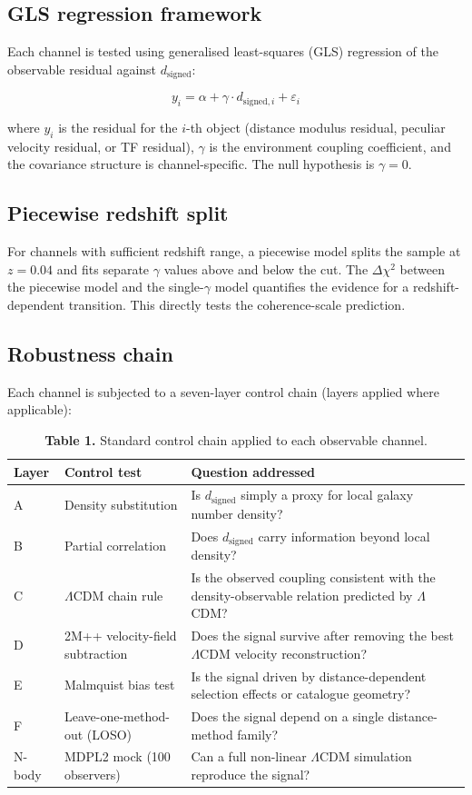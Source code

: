 \documentclass[11pt,a4paper]{article}
\begin{document}
\subsection{GLS regression framework}
Each channel is tested using generalised least-squares (GLS) regression of the observable residual against \(d_\mathrm{signed}\):

\[
y_i = \alpha + \gamma \cdot d_{\mathrm{signed},i} + \varepsilon_i
\]

where \(y_i\) is the residual for the \(i\)-th object (distance modulus residual, peculiar velocity residual, or TF residual), \(\gamma\) is the environment coupling coefficient, and the covariance structure is channel-specific. The null hypothesis is \(\gamma = 0\).

\subsection{Piecewise redshift split}
For channels with sufficient redshift range, a piecewise model splits the sample at \(z = 0.04\) and fits separate \(\gamma\) values above and below the cut. The \(\Delta\chi^2\) between the piecewise model and the single-\(\gamma\) model quantifies the evidence for a redshift-dependent transition. This directly tests the coherence-scale prediction.

\subsection{Robustness chain}
Each channel is subjected to a seven-layer control chain (layers applied where applicable):

\begin{table}[H]
\centering
\footnotesize
\caption{\textbf{Table 1.} Standard control chain applied to each observable channel.}
\begin{tabularx}{\linewidth}{l>{\RaggedRight\arraybackslash}X>{\RaggedRight\arraybackslash}X}
\toprule
\textbf{Layer} & \textbf{Control test} & \textbf{Question addressed} \tabularnewline
\midrule
A & Density substitution & Is \(d_\mathrm{signed}\) simply a proxy for local galaxy number density? \tabularnewline
B & Partial correlation & Does \(d_\mathrm{signed}\) carry information beyond local density? \tabularnewline
C & \(\Lambda\)CDM chain rule & Is the observed coupling consistent with the density-observable relation predicted by \(\Lambda\)CDM? \tabularnewline
D & 2M++ velocity-field subtraction & Does the signal survive after removing the best \(\Lambda\)CDM velocity reconstruction? \tabularnewline
E & Malmquist bias test & Is the signal driven by distance-dependent selection effects or catalogue geometry? \tabularnewline
F & Leave-one-method-out (LOSO) & Does the signal depend on a single distance-method family? \tabularnewline
N-body & MDPL2 mock (100 observers) & Can a full non-linear \(\Lambda\)CDM simulation reproduce the signal? \tabularnewline
\bottomrule
\end{tabularx}
\end{table}
\end{document}
